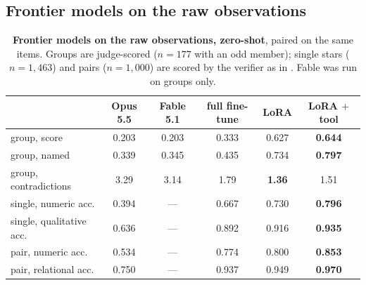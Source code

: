 \subsection{Frontier models on the raw observations}\label{app:frontiertab}
\begin{table}[h]\centering\small
\caption{\textbf{Frontier models on the raw observations, zero-shot}, paired on the same items.
Groups are judge-scored ($n=177$ with an odd member); single stars ($n=1{,}463$) and pairs
($n=1{,}000$) are scored by the verifier as in . Fable was run on groups only.}
\label{tab:frontier}
\begin{tabular}{lccccc}
\toprule
 & Opus 5.5 & Fable 5.1 & full fine-tune & LoRA & LoRA $+$ tool \\
\midrule
group, score          & 0.203 & 0.203 & 0.333 & 0.627 & \textbf{0.644} \\
group, named          & 0.339 & 0.345 & 0.435 & 0.734 & \textbf{0.797} \\
group, contradictions & 3.29  & 3.14  & 1.79  & \textbf{1.36} & 1.51 \\
\midrule
single, numeric acc.     & 0.394 & --- & 0.667 & 0.730 & \textbf{0.796} \\
single, qualitative acc. & 0.636 & --- & 0.892 & 0.916 & \textbf{0.935} \\
pair, numeric acc.       & 0.534 & --- & 0.774 & 0.800 & \textbf{0.853} \\
pair, relational acc.    & 0.750 & --- & 0.937 & 0.949 & \textbf{0.970} \\
\bottomrule
\end{tabular}
\end{table}
\FloatBarrier

